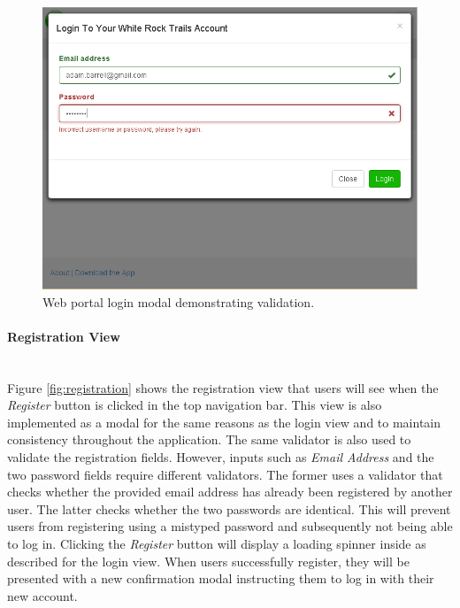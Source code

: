 \documentclass[11pt,a4paper]{report}
\begin{document}
\begin{figure}[H]

\centering

\includegraphics[width=0.7\linewidth]{./img/webportal/login}

\caption{Web portal login modal demonstrating validation.}

\label{fig:login}

\end{figure}



\paragraph{Registration View}\mbox{}\\
Figure \ref{fig:registration} shows the registration view that users will see when the \emph{Register} button is clicked in the top navigation bar. This view is also implemented as a modal for the same reasons as the login view and to maintain consistency throughout the application. The same validator is also used to validate the registration fields. However, inputs such as \emph{Email Address} and the two password fields require different validators. The former uses a validator that checks whether the provided email address has already been registered by another user. The latter checks whether the two passwords are identical. This will prevent users from registering using a mistyped password and subsequently not being able to log in. Clicking the \emph{Register} button will display a loading spinner inside as described for the login view. When users successfully register, they will be presented with a new confirmation modal instructing them to log in with their new account\cite{milestone2}.
\end{document}
